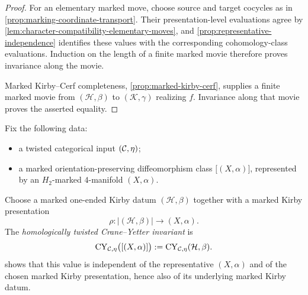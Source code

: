 \begin{proof}
For an elementary marked move, choose source and target cocycles as in
\cref{prop:marking-coordinate-transport}.  Their presentation-level
evaluations agree by \cref{lem:character-compatibility-elementary-moves}, and
\cref{prop:representative-independence} identifies these values with the
corresponding cohomology-class evaluations.  Induction on the length of a
finite marked movie therefore proves invariance along the movie.

Marked Kirby--Cerf completeness, \cref{prop:marked-kirby-cerf}, supplies a
finite marked movie from \((\mathcal H,\beta)\) to
\((\mathcal K,\gamma)\) realizing \(f\).  Invariance along that movie proves
the asserted equality.
\end{proof}

\begin{definition}
\label{def:twisted-crane-yetter-invariant}
Fix the following data:
\begin{itemize}
  \item a twisted categorical input \((\mathcal{C},\eta)\);
  \item a marked orientation-preserving diffeomorphism class
  \(\bigl[(X,\alpha)\bigr]\), represented by an \(H_2\)-marked
  \(4\)-manifold \((X,\alpha)\).
\end{itemize}
Choose a marked one-ended Kirby datum \((\mathcal H,\beta)\) together with a
marked Kirby presentation
\[
  \rho\colon|(\mathcal H,\beta)|\longrightarrow(X,\alpha).
\]
The \emph{homologically twisted Crane--Yetter invariant} is
\[
  \operatorname{CY}_{\mathcal{C},\eta}\bigl([(X,\alpha)]\bigr)
  :=\operatorname{CY}_{\mathcal{C},\eta}(\mathcal H,\beta).
\]
 shows that this value is
independent of the representative \((X,\alpha)\) and of the chosen marked
Kirby presentation, hence also of its underlying marked Kirby datum.
\end{definition}
